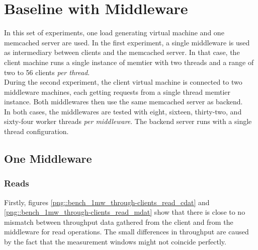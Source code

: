 \documentclass[11pt,a4paper]{article}
\begin{document}
\section{Baseline with Middleware \label{section::net_queues}}
In this set of experiments, one load generating virtual machine and one memcached server are used. In the first experiment, a single middleware is used as intermediary between clients and the memcached server. In that case, the client machine runs a single instance of memtier with two threads and a range of two to 56 clients \textit{per thread}.\\
During the second experiment, the client virtual machine is connected to two middleware machines, each getting requests from a single thread memtier instance. Both middlewares then use the same memcached server as backend.\\
In both cases, the middlewares are tested with eight, sixteen, thirty-two, and sixty-four worker threads \textit{per middleware}. The backend server runs with a single thread configuration.

\subsection{One Middleware}
\subsubsection{Reads}
Firstly, figures \ref{png::bench_1mw_through-clients_read_cdat} and \ref{png::bench_1mw_through-clients_read_mdat} show that there is close to no mismatch between throughput data gathered from the client and from the middleware for read operations. The small differences in throughput are caused by the fact that the measurement windows might not coincide perfectly.
\end{document}
